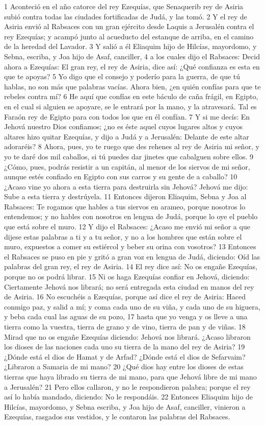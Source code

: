1 Aconteció en el año catorce del rey Ezequías, que Senaquerib rey de Asiria subió contra todas las ciudades fortificadas de Judá, y las tomó.
2 Y el rey de Asiria envió al Rabsaces con un gran ejército desde Laquis a Jerusalén contra el rey Ezequías; y acampó junto al acueducto del estanque de arriba, en el camino de la heredad del Lavador.
3 Y salió a él Eliaquim hijo de Hilcías, mayordomo, y Sebna, escriba, y Joa hijo de Asaf, canciller,
4 a los cuales dijo el Rabsaces: Decid ahora a Ezequías: El gran rey, el rey de Asiria, dice así: ¿Qué confianza es esta en que te apoyas?
5 Yo digo que el consejo y poderío para la guerra, de que tú hablas, no son más que palabras vacías. Ahora bien, ¿en quién confías para que te rebeles contra mí?
6 He aquí que confías en este báculo de caña frágil, en Egipto, en el cual si alguien se apoyare, se le entrará por la mano, y la atravesará. Tal es Faraón rey de Egipto para con todos los que en él confían.
7 Y si me decís: En Jehová nuestro Dios confiamos; ¿no es éste aquel cuyos lugares altos y cuyos altares hizo quitar Ezequías, y dijo a Judá y a Jerusalén: Delante de este altar adoraréis?
8 Ahora, pues, yo te ruego que des rehenes al rey de Asiria mi señor, y yo te daré dos mil caballos, si tú puedes dar jinetes que cabalguen sobre ellos.
9 ¿Cómo, pues, podrás resistir a un capitán, al menor de los siervos de mi señor, aunque estés confiado en Egipto con sus carros y su gente de a caballo?
10 ¿Acaso vine yo ahora a esta tierra para destruirla sin Jehová? Jehová me dijo: Sube a esta tierra y destrúyela.
11 Entonces dijeron Eliaquim, Sebna y Joa al Rabsaces: Te rogamos que hables a tus siervos en arameo, porque nosotros lo entendemos; y no hables con nosotros en lengua de Judá, porque lo oye el pueblo que está sobre el muro.
12 Y dijo el Rabsaces: ¿Acaso me envió mi señor a que dijese estas palabras a ti y a tu señor, y no a los hombres que están sobre el muro, expuestos a comer su estiércol y beber su orina con vosotros?
13 Entonces el Rabsaces se puso en pie y gritó a gran voz en lengua de Judá, diciendo: Oíd las palabras del gran rey, el rey de Asiria.
14 El rey dice así: No os engañe Ezequías, porque no os podrá librar.
15 Ni os haga Ezequías confiar en Jehová, diciendo: Ciertamente Jehová nos librará; no será entregada esta ciudad en manos del rey de Asiria.
16 No escuchéis a Ezequías, porque así dice el rey de Asiria: Haced conmigo paz, y salid a mí; y coma cada uno de su viña, y cada uno de su higuera, y beba cada cual las aguas de su pozo,
17 hasta que yo venga y os lleve a una tierra como la vuestra, tierra de grano y de vino, tierra de pan y de viñas.
18 Mirad que no os engañe Ezequías diciendo: Jehová nos librará. ¿Acaso libraron los dioses de las naciones cada uno su tierra de la mano del rey de Asiria?
19 ¿Dónde está el dios de Hamat y de Arfad? ¿Dónde está el dios de Sefarvaim? ¿Libraron a Samaria de mi mano?
20 ¿Qué dios hay entre los dioses de estas tierras que haya librado su tierra de mi mano, para que Jehová libre de mi mano a Jerusalén?
21 Pero ellos callaron, y no le respondieron palabra; porque el rey así lo había mandado, diciendo: No le respondáis.
22 Entonces Eliaquim hijo de Hilcías, mayordomo, y Sebna escriba, y Joa hijo de Asaf, canciller, vinieron a Ezequías, rasgados sus vestidos, y le contaron las palabras del Rabsaces.

